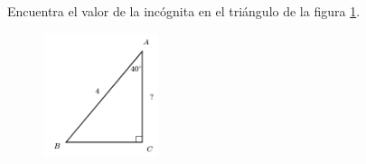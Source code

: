 \question[15]  Encuentra el valor de la incógnita en el triángulo de la figura \ref{fig:lados_functrig_13}.
\begin{figure}[H]
    \begin{center}
        \includegraphics[width=0.3\textwidth]{../images/lados_functrig_13.png}
    \end{center}
    \caption{}
    \label{fig:lados_functrig_13}
\end{figure}